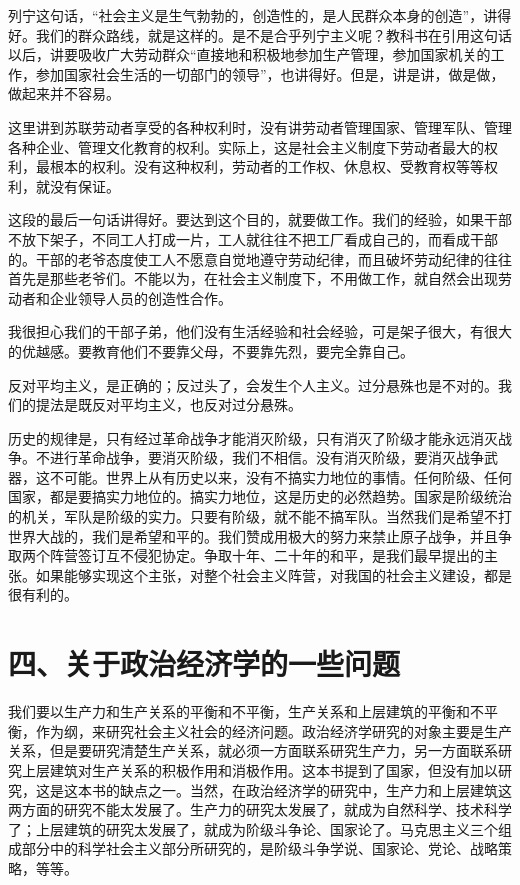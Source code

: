 列宁这句话，“社会主义是生气勃勃的，创造性的，是人民群众本身的创造”，讲得好。我们的群众路线，就是这样的。是不是合乎列宁主义呢？教科书在引用这句话以后，讲要吸收广大劳动群众“直接地和积极地参加生产管理，参加国家机关的工作，参加国家社会生活的一切部门的领导”，也讲得好。但是，讲是讲，做是做，做起来并不容易。

这里讲到苏联劳动者享受的各种权利时，没有讲劳动者管理国家、管理军队、管理各种企业、管理文化教育的权利。实际上，这是社会主义制度下劳动者最大的权利，最根本的权利。没有这种权利，劳动者的工作权、休息权、受教育权等等权利，就没有保证。

这段的最后一句话讲得好。要达到这个目的，就要做工作。我们的经验，如果干部不放下架子，不同工人打成一片，工人就往往不把工厂看成自己的，而看成干部的。干部的老爷态度使工人不愿意自觉地遵守劳动纪律，而且破坏劳动纪律的往往首先是那些老爷们。不能以为，在社会主义制度下，不用做工作，就自然会出现劳动者和企业领导人员的创造性合作。

我很担心我们的干部子弟，他们没有生活经验和社会经验，可是架子很大，有很大的优越感。要教育他们不要靠父母，不要靠先烈，要完全靠自己。

反对平均主义，是正确的；反过头了，会发生个人主义。过分悬殊也是不对的。我们的提法是既反对平均主义，也反对过分悬殊。

历史的规律是，只有经过革命战争才能消灭阶级，只有消灭了阶级才能永远消灭战争。不进行革命战争，要消灭阶级，我们不相信。没有消灭阶级，要消灭战争武器，这不可能。世界上从有历史以来，没有不搞实力地位的事情。任何阶级、任何国家，都是要搞实力地位的。搞实力地位，这是历史的必然趋势。国家是阶级统治的机关，军队是阶级的实力。只要有阶级，就不能不搞军队。当然我们是希望不打世界大战的，我们是希望和平的。我们赞成用极大的努力来禁止原子战争，并且争取两个阵营签订互不侵犯协定。争取十年、二十年的和平，是我们最早提出的主张。如果能够实现这个主张，对整个社会主义阵营，对我国的社会主义建设，都是很有利的。

\section{四、关于政治经济学的一些问题}

我们要以生产力和生产关系的平衡和不平衡，生产关系和上层建筑的平衡和不平衡，作为纲，来研究社会主义社会的经济问题。政治经济学研究的对象主要是生产关系，但是要研究清楚生产关系，就必须一方面联系研究生产力，另一方面联系研究上层建筑对生产关系的积极作用和消极作用。这本书提到了国家，但没有加以研究，这是这本书的缺点之一。当然，在政治经济学的研究中，生产力和上层建筑这两方面的研究不能太发展了。生产力的研究太发展了，就成为自然科学、技术科学了；上层建筑的研究太发展了，就成为阶级斗争论、国家论了。马克思主义三个组成部分中的科学社会主义部分所研究的，是阶级斗争学说、国家论、党论、战略策略，等等。


